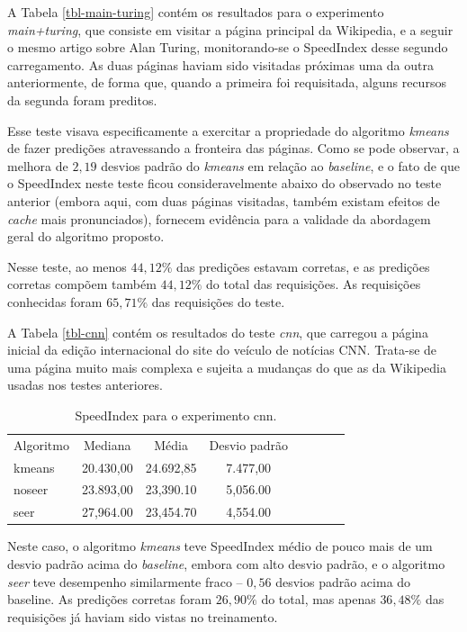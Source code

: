 \documentclass[10pt,twocolumn,letterpaper]{article}
\begin{document}
A Tabela \ref{tbl-main-turing} contém os resultados para o experimento \emph{main+turing}, que consiste em visitar a página principal da Wikipedia, e a seguir o mesmo artigo sobre Alan Turing, monitorando-se o SpeedIndex desse segundo carregamento. As duas páginas haviam sido visitadas próximas uma da outra anteriormente, de forma que, quando a primeira foi requisitada, alguns recursos da segunda foram preditos.

Esse teste visava especificamente a exercitar a propriedade do algoritmo \emph{kmeans} de fazer predições atravessando a fronteira das páginas. Como se pode observar,  a melhora de $2,19$ desvios padrão do \emph{kmeans} em relação ao \emph{baseline}, e o fato de que o SpeedIndex neste teste ficou consideravelmente abaixo do observado no teste anterior (embora aqui, com duas páginas visitadas, também existam efeitos de \emph{cache} mais pronunciados), fornecem evidência para a validade da abordagem geral do algoritmo proposto.

Nesse teste, ao menos $44,12 \%$ das predições estavam corretas, e as predições corretas compõem também $44,12 \%$ do total das requisições. As requisições conhecidas foram $65,71 \%$ das requisições do teste.

A Tabela \ref{tbl-cnn} contém os resultados do teste \emph{cnn}, que carregou a página inicial da edição internacional do site do veículo de notícias CNN. Trata-se de uma página muito mais complexa e sujeita a mudanças do que as da Wikipedia usadas nos testes anteriores.

\begin{table}
\begin{center}
\begin{tabular}{l*{6}{c}r}
\hline
Algoritmo & Mediana & Média & Desvio padrão \\
kmeans & 20.430,00 & 24.692,85 & 7.477,00 \\
noseer & 23.893,00 & 23,390.10 & 5,056.00 \\
seer & 27,964.00 & 23,454.70 & 4,554.00 \\
\hline
\end{tabular}
\end{center}
\caption{SpeedIndex para o experimento cnn.}
\label{tbl-cnn-politics}
\end{table}

Neste caso, o algoritmo \emph{kmeans} teve SpeedIndex médio de pouco mais de um desvio padrão acima do \emph{baseline}, embora com alto desvio padrão, e o algoritmo \emph{seer} teve desempenho similarmente fraco -- $0,56$ desvios padrão acima do baseline. As predições corretas foram $26,90 \%$ do total, mas apenas $36,48 \%$ das requisições já haviam sido vistas no treinamento.
\end{document}
